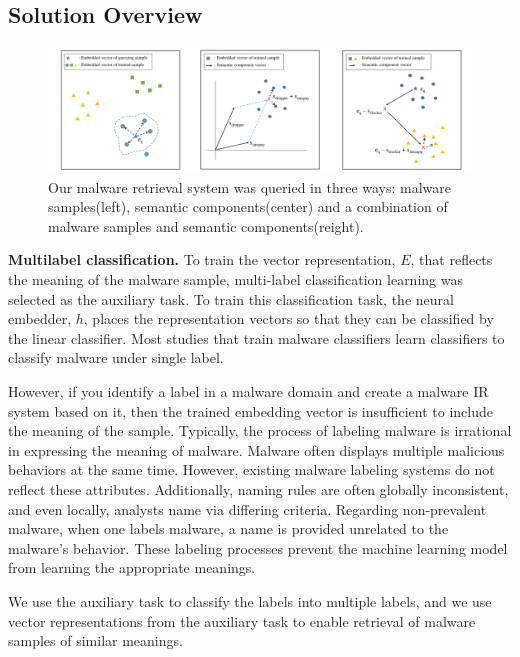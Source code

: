 \subsection{Solution Overview}
\begin{figure}[!htb] %
  \includegraphics[width=\textwidth]{../../figures/qualitative_all_fix.pdf}
  \caption{Our malware retrieval system was queried in three ways: malware samples(left), semantic components(center) and a combination of malware samples and semantic components(reight).}
  \label{fig:qualitative_all}
\end{figure}

\textbf{Multilabel classification. }
To train the vector representation, $E$, that reflects the meaning of the malware sample, multi-label classification learning was selected as the auxiliary task. To train this classification task, the neural embedder, $h$, places the representation vectors so that they can be classified by the linear classifier. Most studies that train malware classifiers learn classifiers to classify malware under single label.

However, if you identify a label in a malware domain and create a malware IR system based on it, then the trained embedding vector is insufficient to include the meaning of the sample. Typically, the process of labeling malware is irrational in expressing the meaning of malware. Malware often displays multiple malicious behaviors at the same time. However, existing malware labeling systems do not reflect these attributes. Additionally, naming rules are often globally inconsistent, and even locally, analysts name via differing criteria. Regarding non-prevalent malware, when one labels malware, a name is provided unrelated to the malware’s behavior. These labeling processes prevent the machine learning model from learning the appropriate meanings. 

We use the auxiliary task to classify the labels into multiple labels, and we use vector representations from the auxiliary task to enable retrieval of malware samples of similar meanings.



